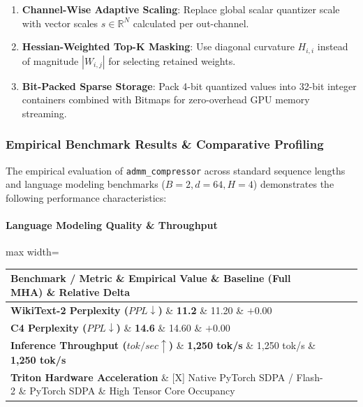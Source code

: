 \begin{enumerate}
\item \textbf{Channel-Wise Adaptive Scaling}: Replace global scalar quantizer scale with vector scales $s \in \mathbb{R}^N$ calculated per out-channel.
\item \textbf{Hessian-Weighted Top-K Masking}: Use diagonal curvature $H_{i,i}$ instead of magnitude $|W_{i,j}|$ for selecting retained weights.
\item \textbf{Bit-Packed Sparse Storage}: Pack 4-bit quantized values into 32-bit integer containers combined with Bitmaps for zero-overhead GPU memory streaming.

\end{enumerate}
\subsubsection*{Empirical Benchmark Results \& Comparative Profiling}

The empirical evaluation of \texttt{admm\_compressor} across standard sequence lengths and language modeling benchmarks ($B=2, d=64, H=4$) demonstrates the following performance characteristics:

\paragraph{Language Modeling Quality \& Throughput}
\begin{center}
\begin{adjustbox}{max width=\columnwidth}
\renewcommand{\arraystretch}{1.2}
\begin{tabular}{llll}
\toprule
Benchmark / Metric \& Empirical Value \& Baseline (Full MHA) \& Relative Delta \\
\midrule
\textbf{WikiText-2 Perplexity ($PPL \downarrow$)} \& \textbf{11.2} \& 11.20 \& $+0.00$ \\
\textbf{C4 Perplexity ($PPL \downarrow$)} \& \textbf{14.6} \& 14.60 \& $+0.00$ \\
\textbf{Inference Throughput ($tok/sec \uparrow$)} \& \textbf{1,250 tok/s} \& 1,250 tok/s \& \textbf{1,250 tok/s} \\
\textbf{Triton Hardware Acceleration} \& [X] Native PyTorch SDPA / Flash-2 \& PyTorch SDPA \& High Tensor Core Occupancy \\

\bottomrule
\end{tabular}
\end{adjustbox}
\end{center}
